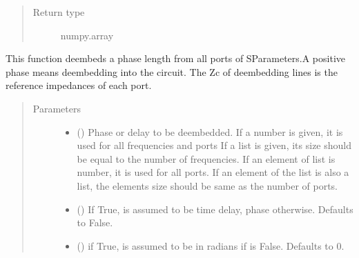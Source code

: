 \documentclass[letterpaper,10pt,english]{sphinxmanual}
\begin{document}
\begin{fulllineitems}
\begin{fulllineitems}
\begin{quote}
\begin{description}
\item[{Return type}] \leavevmode
numpy.array

\end{description}\end{quote}

\end{fulllineitems}


\begin{fulllineitems}
\label{\detokenize{touchstone:touchstone.spfile.UniformDeembed}}
This function deembeds a phase length from all ports of S\sphinxhyphen{}Parameters.A positive phase means deembedding into the circuit.
The Zc of de\sphinxhyphen{}embedding lines is the reference impedances of each port.
\begin{quote}\begin{description}
\item[{Parameters}] \leavevmode\begin{itemize}
\item {} 
 () \textendash{} Phase or delay to be deembedded.
\sphinxhyphen{} If a number is given, it is used for all frequencies and ports
\sphinxhyphen{} If a list is given, its size should be equal to the number of frequencies. If an element of list is number, it is used for all ports. If an element of the list is also a list, the elements size should be same as the number of ports.

\item {} 
 (\sphinxstyleliteralemphasis{\sphinxupquote{, }}) \textendash{} If True,  is assumed to be time delay, phase otherwise. Defaults to False.

\item {} 
 (\sphinxstyleliteralemphasis{\sphinxupquote{, }}) \textendash{} if True,  is assumed to be in radians if  is False. Defaults to 0.


\end{itemize}
\end{description}
\end{quote}
\end{fulllineitems}
\end{fulllineitems}
\end{document}
